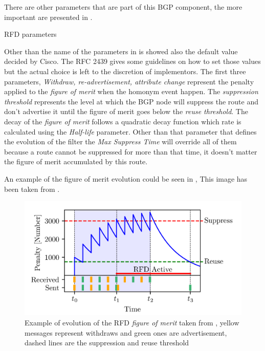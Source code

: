 There are other parameters that are part of this \ac{BGP} component, the more 
important are presented in .

\begin{table}[ht]
	
	\caption{\ac{RFD} parameters}
	\label{tbl:rfd_defaults}
\end{table}

Other than the name of the parameters in  is showed also
the default value decided by Cisco.
The \ac{RFC} \num{2439} \cite{rfc2439} gives some guidelines on how to set those
values but the actual choice is left to the discretion of implementors.
The first three parameters, \textit{Withdraw, re-advertisement, attribute change}
represent the penalty applied to the \textit{figure of merit} when the homonym event
happen.
The \textit{suppression threshold} represents the level at which the \ac{BGP} node will
suppress the route and don't advertise it until the figure of merit goes
below the \textit{reuse threshold}.
The decay of the \textit{figure of merit} follows a quadratic decay function
which rate is calculated using the \textit{Half-life} parameter.
Other than that parameter that defines the evolution of the filter the
\textit{Max Suppress Time} will override all of them because a route cannot
be suppressed for more than that time, it doesn't matter the figure of merit
accumulated by this route.

An example of the figure of merit evolution could be seen in ,
This image has been taken from \cite{gray2020bgp}.

\begin{figure}[ht]
    \centering
    \includegraphics[scale=0.22]{images/RFD/evolution.png}
	\caption{Example of evolution of the \ac{RFD} \textit{figure of merit} taken 
	from \cite{gray2020bgp}, yellow messages represent withdraws and green ones
	are advertisement, dashed lines are the suppression and reuse threshold}
    \label{fig:figure_of_merit}
\end{figure}

